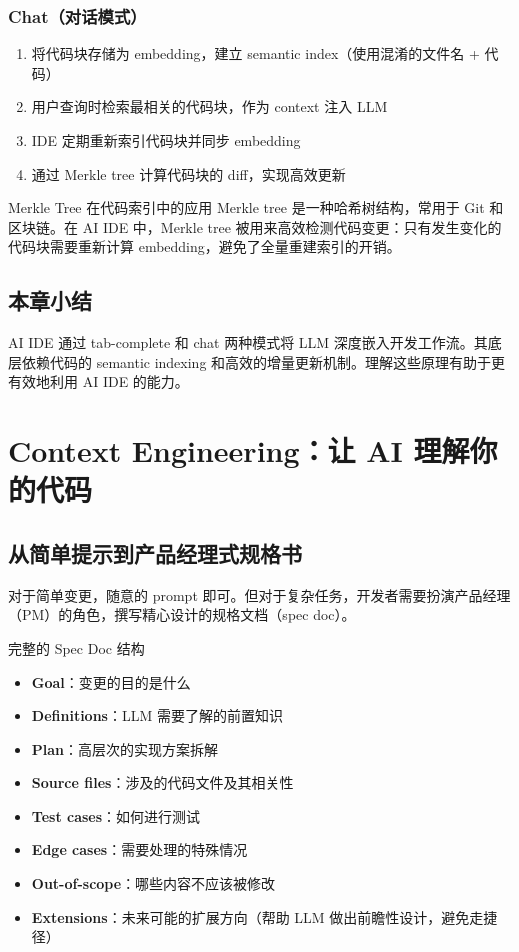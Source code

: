\documentclass[a4paper]{article}
\begin{document}
\subsubsection{Chat（对话模式）}

\begin{enumerate}
    \item 将代码块存储为 embedding，建立 semantic index（使用混淆的文件名 + 代码）
    \item 用户查询时检索最相关的代码块，作为 context 注入 LLM
    \item IDE 定期重新索引代码块并同步 embedding
    \item 通过 Merkle tree 计算代码块的 diff，实现高效更新
\end{enumerate}

\begin{importantbox}{Merkle Tree 在代码索引中的应用}
Merkle tree 是一种哈希树结构，常用于 Git 和区块链。在 AI IDE 中，Merkle tree 被用来高效检测代码变更：只有发生变化的代码块需要重新计算 embedding，避免了全量重建索引的开销。
\end{importantbox}

\subsection{本章小结}

AI IDE 通过 tab-complete 和 chat 两种模式将 LLM 深度嵌入开发工作流。其底层依赖代码的 semantic indexing 和高效的增量更新机制。理解这些原理有助于更有效地利用 AI IDE 的能力。

\section{Context Engineering：让 AI 理解你的代码}

\subsection{从简单提示到产品经理式规格书}

对于简单变更，随意的 prompt 即可。但对于复杂任务，开发者需要扮演产品经理（PM）的角色，撰写精心设计的规格文档（spec doc）。

\begin{importantbox}{完整的 Spec Doc 结构}
\begin{itemize}
    \item \textbf{Goal}：变更的目的是什么
    \item \textbf{Definitions}：LLM 需要了解的前置知识
    \item \textbf{Plan}：高层次的实现方案拆解
    \item \textbf{Source files}：涉及的代码文件及其相关性
    \item \textbf{Test cases}：如何进行测试
    \item \textbf{Edge cases}：需要处理的特殊情况
    \item \textbf{Out-of-scope}：哪些内容不应该被修改
    \item \textbf{Extensions}：未来可能的扩展方向（帮助 LLM 做出前瞻性设计，避免走捷径）
\end{itemize}
\end{importantbox}
\end{document}
